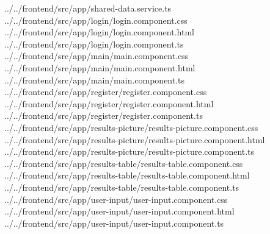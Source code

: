          {../../frontend/src/app/shared-data.service.ts}
            {../../frontend/src/app/login/login.component.css}
           {../../frontend/src/app/login/login.component.html}
             {../../frontend/src/app/login/login.component.ts}
             {../../frontend/src/app/main/main.component.css}
            {../../frontend/src/app/main/main.component.html}
              {../../frontend/src/app/main/main.component.ts}
         {../../frontend/src/app/register/register.component.css}
        {../../frontend/src/app/register/register.component.html}
          {../../frontend/src/app/register/register.component.ts}
  {../../frontend/src/app/results-picture/results-picture.component.css}
 {../../frontend/src/app/results-picture/results-picture.component.html}
   {../../frontend/src/app/results-picture/results-picture.component.ts}
    {../../frontend/src/app/results-table/results-table.component.css}
   {../../frontend/src/app/results-table/results-table.component.html}
     {../../frontend/src/app/results-table/results-table.component.ts}
       {../../frontend/src/app/user-input/user-input.component.css}
      {../../frontend/src/app/user-input/user-input.component.html}
        {../../frontend/src/app/user-input/user-input.component.ts}
